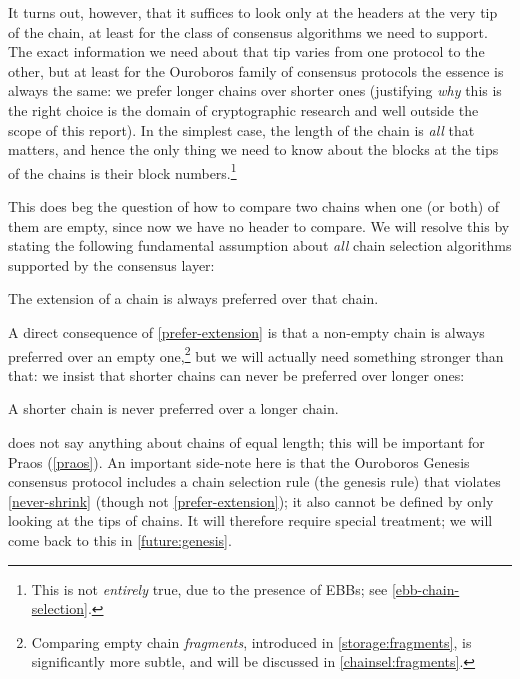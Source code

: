 It turns out, however, that it suffices to look only at the headers at the very
tip of the chain, at least for the class of consensus algorithms we need to
support. The exact information we need about that tip varies from
one protocol to the other, but at least for the Ouroboros family of consensus
protocols the essence is always the same: we prefer longer chains over shorter
ones (justifying \emph{why} this is the right choice is the domain  of
cryptographic research and well outside the scope of this report). In the
simplest case, the length of the chain is \emph{all} that matters, and hence the
only thing we need to know about the blocks at the tips of the chains is their
block numbers.\footnote{This is not \emph{entirely} true, due to the presence of
EBBs; see \cref{ebb-chain-selection}.}

This does beg the question of how to compare two chains when one (or both) of
them are empty, since now we have no header to compare. We will resolve this by
stating the following fundamental assumption about \emph{all} chain selection
algorithms supported by the consensus layer:

\begin{assumption}
\label{prefer-extension}
The extension of a chain is always preferred over that chain.
\end{assumption}

A direct consequence of \cref{prefer-extension} is that a non-empty chain is
always preferred over an empty one,\footnote{Comparing empty chain
\emph{fragments}, introduced in \cref{storage:fragments}, is significantly more
subtle, and will be discussed in \cref{chainsel:fragments}.} but we will
actually need something stronger than that: we insist that shorter chains can
never be preferred over longer ones:

\begin{assumption}
\label{never-shrink}
A shorter chain is never preferred over a longer chain.
\end{assumption}

 does not say anything about chains of equal length; this will
be important for Praos (\cref{praos}). An important side-note here is that
the Ouroboros Genesis consensus protocol includes a chain selection rule
(the genesis rule) that violates \cref{never-shrink} (though not \cref{prefer-extension}); it also cannot be defined by only looking at the tips of chains.
It will therefore require special treatment; we will come back to this in
\cref{future:genesis}.

